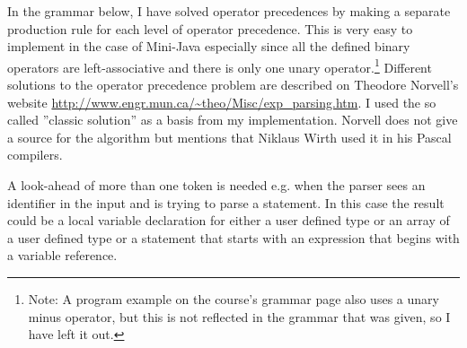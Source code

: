 \documentclass[a4paper,11pt]{article}
\begin{document}
In the grammar below, I have solved operator precedences by making a separate production rule for each level of operator precedence. This is very easy to implement in the case of Mini-Java especially since all the defined binary operators are left-associative and there is only one unary operator.\footnote{Note: A program example on the course's grammar page also uses a unary minus operator, but this is not reflected in the grammar that was given, so I have left it out.} Different solutions to the operator precedence problem are described on Theodore Norvell's website \url{http://www.engr.mun.ca/~theo/Misc/exp_parsing.htm}. I used the so called ''classic solution'' as a basis from my implementation. Norvell does not give a source for the algorithm but mentions that Niklaus Wirth used it in his Pascal compilers. 

A look-ahead of more than one token is needed e.g. when the parser sees an identifier in the input and is trying to parse a statement. In this case the result could be a local variable declaration for either a user defined type or an array of a user defined type or a statement that starts with an expression that begins with a variable reference.
\end{document}
